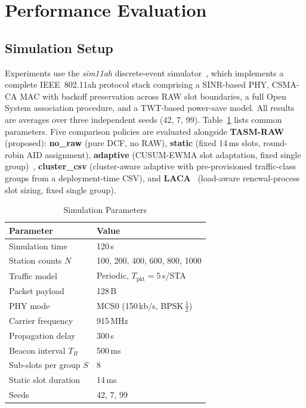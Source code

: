 \documentclass[conference]{IEEEtran}
\begin{document}
\section{Performance Evaluation}
\label{sec:eval}

\subsection{Simulation Setup}

Experiments use the \textit{sim11ah} discrete-event simulator~\cite{kalita2025},
which implements a complete IEEE~802.11ah protocol stack comprising a
SINR-based PHY, CSMA-CA MAC with backoff preservation across RAW slot
boundaries, a full Open System association procedure, and a TWT-based
power-save model.
All results are averages over three independent seeds (42, 7, 99).
Table~\ref{tab:setup} lists common parameters.
Five comparison policies are evaluated alongside \textbf{TASM-RAW} (proposed):
\textbf{no\_raw} (pure DCF, no RAW),
\textbf{static} (fixed 14\,ms slots, round-robin AID assignment),
\textbf{adaptive} (CUSUM-EWMA slot adaptation, fixed single
  group)~\cite{kalita2025},
\textbf{cluster\_csv} (cluster-aware adaptive with pre-provisioned
  traffic-class groups from a deployment-time CSV),
and \textbf{LACA}~\cite{taramit2023} (load-aware renewal-process slot
sizing, fixed single group).

\begin{table}[!t]
\renewcommand{\arraystretch}{1.15}
\caption{Simulation Parameters}
\label{tab:setup}
\centering
\begin{tabular}{@{}ll@{}}
\toprule
\textbf{Parameter}           & \textbf{Value} \\
\midrule
Simulation time              & 120\,s \\
Station counts $N$           & 100, 200, 400, 600, 800, 1000 \\
Traffic model                & Periodic, $T_\mathrm{pkt}\!=\!5$\,s/STA \\
Packet payload               & 128\,B \\
PHY mode                     & MCS0 (150\,kb/s, BPSK\,$\frac{1}{2}$) \\
Carrier frequency            & 915\,MHz \\
Propagation delay            & 300\,\textmu{}s \\
Beacon interval $T_B$        & 500\,ms \\
Sub-slots per group $S$      & 8 \\
Static slot duration         & 14\,ms \\
Seeds                        & 42, 7, 99 \\
\bottomrule
\end{tabular}
\end{table}
\end{document}
